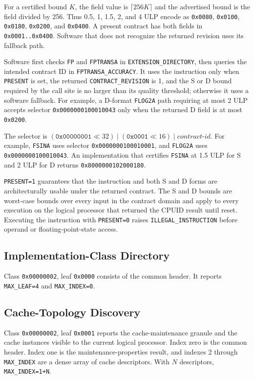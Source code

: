 For a certified bound $K$, the field value is $\lceil 256K\rceil$ and the advertised bound is the field divided by
256. Thus 0.5, 1, 1.5, 2, and 4 ULP encode as \texttt{0x0080}, \texttt{0x0100}, \texttt{0x0180},
\texttt{0x0200}, and \texttt{0x0400}. A present contract has both fields in \texttt{0x0001..0x0400}.
Software that does not recognize the returned revision uses its fallback path.

Software first checks \texttt{FP} and \texttt{FPTRANSA} in \texttt{EXTENSION\_DIRECTORY}, then queries the intended
contract ID in \texttt{FPTRANSA\_ACCURACY}. It uses the instruction only when \texttt{PRESENT} is set, the returned
\texttt{CONTRACT\_REVISION} is 1, and the S or D bound required by the call site is no larger than its quality
threshold; otherwise it
uses a software fallback. For example, a D-format \texttt{FLOG2A} path requiring at most 2 ULP accepts selector
\texttt{0x0000000100010043} only when the returned D field is at most \texttt{0x0200}.

The selector is $(\texttt{0x00000001} \ll 32) \mathbin{|} (\texttt{0x0001} \ll 16) \mathbin{|}
\textit{contract-id}$. For example, \texttt{FSINA} uses selector \texttt{0x0000000100010001}, and
\texttt{FLOG2A} uses \texttt{0x0000000100010043}. An implementation that certifies \texttt{FSINA} at 1.5 ULP for
S and 2 ULP for D returns \texttt{0x8000000102000180}.

\texttt{PRESENT=1} guarantees that the instruction and both S and D forms are architecturally usable under the
returned contract. The S and D bounds are worst-case bounds over every input in the contract domain and apply to
every execution on the logical processor that returned the CPUID result until reset. Executing the instruction with
\texttt{PRESENT=0} raises \texttt{ILLEGAL\_INSTRUCTION} before operand or floating-point-state access.



\subsection{Implementation-Class Directory}
Class \texttt{0x00000002}, leaf \texttt{0x0000} consists of the common header. It reports
\texttt{MAX\_LEAF=4} and \texttt{MAX\_INDEX=0}.

\subsection{Cache-Topology Discovery}
Class \texttt{0x00000002}, leaf \texttt{0x0001} reports the cache-maintenance granule and the cache instances visible
to the current logical processor. Index zero is the common header. Index one is the maintenance-properties result,
and indexes 2 through \texttt{MAX\_INDEX} are a dense array of cache descriptors. With $N$ descriptors,
\texttt{MAX\_INDEX=1+N}.

